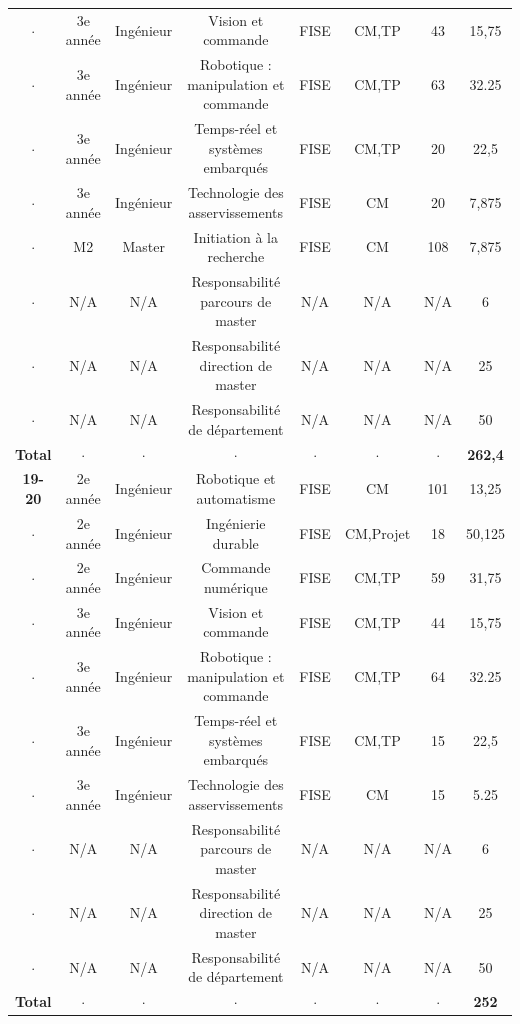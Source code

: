 \documentclass[a4paper,12pt]{article}
\begin{document}
{\begin{tabular}{cccccccc}
  $\cdot$ & 3e année  & Ingénieur & Vision et commande & FISE & CM,TP & 43 & 15,75  \\
  $\cdot$ & 3e année  & Ingénieur & Robotique : manipulation et commande & FISE & CM,TP & 63 & 32.25  \\
  $\cdot$ & 3e année  & Ingénieur & Temps-réel et systèmes embarqués & FISE & CM,TP & 20 & 22,5  \\
  $\cdot$ & 3e année  & Ingénieur & Technologie des asservissements & FISE & CM & 20 & 7,875  \\
  $\cdot$ & M2        & Master    & Initiation à la recherche & FISE & CM & 108 & 7,875  \\
  $\cdot$ & N/A       & N/A       & Responsabilité parcours de master & N/A & N/A & N/A & 6  \\
  $\cdot$ & N/A       & N/A       & Responsabilité direction de master & N/A & N/A & N/A & 25  \\
  $\cdot$ & N/A       & N/A       & Responsabilité de département & N/A & N/A & N/A & 50  \\
 \bf{Total} & $\cdot$ & $\cdot$ & $\cdot$ & $\cdot$ & $\cdot$ & $\cdot$ &  {\bf 262,4} \\\midrule
  \bf{19-20} & 2e année  & Ingénieur & Robotique et automatisme & FISE & CM & 101 & 13,25 \\
 $\cdot$ & 2e année  & Ingénieur & Ingénierie durable  & FISE & CM,Projet & 18  & 50,125  \\
  $\cdot$ & 2e année  & Ingénieur & Commande numérique  & FISE & CM,TP & 59  & 31,75  \\
  $\cdot$ & 3e année  & Ingénieur & Vision et commande & FISE & CM,TP & 44 & 15,75  \\
  $\cdot$ & 3e année  & Ingénieur & Robotique : manipulation et commande & FISE & CM,TP & 64 & 32.25  \\
  $\cdot$ & 3e année  & Ingénieur & Temps-réel et systèmes embarqués & FISE & CM,TP & 15 & 22,5  \\
  $\cdot$ & 3e année  & Ingénieur & Technologie des asservissements & FISE & CM & 15 & 5.25  \\
  $\cdot$ & N/A       & N/A       & Responsabilité parcours de master & N/A & N/A & N/A & 6  \\
  $\cdot$ & N/A       & N/A       & Responsabilité direction de master & N/A & N/A & N/A & 25  \\
  $\cdot$ & N/A       & N/A       & Responsabilité de département & N/A & N/A & N/A & 50  \\
  \bf{Total} & $\cdot$ & $\cdot$ & $\cdot$ & $\cdot$ & $\cdot$ & $\cdot$ &  {\bf 252} \\ \bottomrule
\end{tabular}

}
\end{document}
